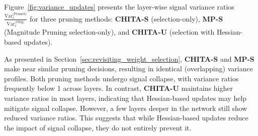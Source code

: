 Figure~\ref{fig:variance_updates} presents the layer-wise signal variance ratios \(\frac{\mathrm{Var}_\ell^{\text{(Pruned)}}}{\mathrm{Var}_\ell^{\text{(Orig)}}}\) for three pruning methods: \textbf{CHITA-S} (selection-only), \textbf{MP-S} (Magnitude Pruning selection-only), and \textbf{CHITA-U} (selection with Hessian-based updates). 

As presented in Section~\ref{sec:revisiting_weight_selection}, \textbf{CHITA-S} and \textbf{MP-S} make near similar pruning decisions, resulting in identical (overlapping) variance profiles. Both pruning methods undergo signal collapse, with variance ratios frequently below 1 across layers. In contrast, \textbf{CHITA-U} maintains higher variance ratios in most layers, indicating that Hessian-based updates may help mitigate signal collapse. However, a few layers deeper in the network still show reduced variance ratios. This suggests that while Hessian-based updates reduce the impact of signal collapse, they do not entirely prevent it.

